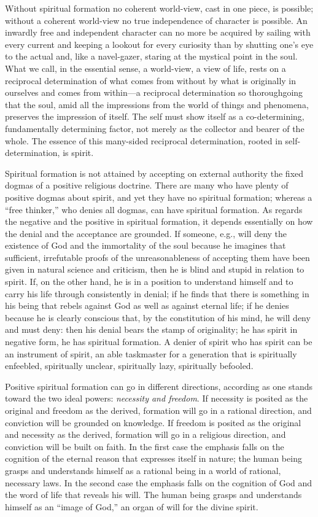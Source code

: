 \documentclass[12pt,a4paper,openany]{book}
\newcommand{\opage}[1]{\marginnote{\footnotesize\textit{[#1]}}}
\begin{document}
Without spiritual formation no coherent world-view, cast in one piece, is
possible; without a coherent world-view no true independence of character
is possible. An inwardly free and independent character can no more be
acquired by sailing with every current and keeping a lookout for every
curiosity than by shutting one's eye to the actual and, like a
navel-gazer, staring at the mystical point in the soul. What we call, in
the essential sense, a world-view, a view of life, rests on a reciprocal
determination of what comes from without by what is originally in
ourselves and comes from within---a reciprocal determination so
thoroughgoing that the soul, amid all the impressions from the world of
things and phenomena, preserves the impression of itself. The self must
show itself as a co-determining, fundamentally determining factor, not
merely as the collector and bearer of the whole. The essence of this
many-sided reciprocal determination, rooted in self-determination, is
spirit.

Spiritual formation is not attained by accepting on external authority
the fixed dogmas of a positive religious doctrine. There are many who
have plenty of \opage{6}positive dogmas about spirit, and yet they have no
spiritual formation; whereas a ``free thinker,'' who denies all dogmas,
can have spiritual formation. As regards the negative and the positive in
spiritual formation, it depends essentially on how the denial and the
acceptance are grounded. If someone, e.g., will deny the existence of God
and the immortality of the soul because he imagines that sufficient,
irrefutable proofs of the unreasonableness of accepting them have been
given in natural science and criticism, then he is blind and stupid in
relation to spirit. If, on the other hand, he is in a position to
understand himself and to carry his life through consistently in denial;
if he finds that there is something in his being that rebels against God
as well as against eternal life; if he denies because he is clearly
conscious that, by the constitution of his mind, he will deny and must
deny: then his denial bears the stamp of originality; he has spirit in
negative form, he has spiritual formation. A denier of spirit who has
spirit can be an instrument of spirit, an able taskmaster for a
generation that is spiritually enfeebled, spiritually unclear,
spiritually lazy, spiritually befooled.

Positive spiritual formation can go in different directions, according
as one stands toward the two ideal powers: \emph{necessity and freedom}.
If necessity is posited as the original and freedom as the derived,
formation will go in a rational direction, and conviction will be
grounded on knowledge. If freedom is posited as the original and
necessity as the derived, formation will go in a religious direction, and
conviction will be built on faith. In the first case the emphasis falls
on the cognition of the eternal reason that expresses itself in nature;
the human being grasps and understands himself as \opage{7}a rational being in a
world of rational, necessary laws. In the second case the emphasis falls
on the cognition of God and the word of life that reveals his will. The
human being grasps and understands himself as an ``image of God,'' an
organ of will for the divine spirit.
\end{document}
